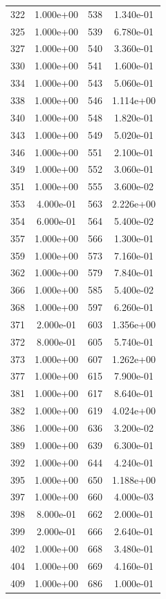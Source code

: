\documentclass[12pt]{article}
\begin{document}
\begin{longtable}{@{}cccc@{}}
322 & 1.000e+00 & 538 & 1.340e-01 \\
325 & 1.000e+00 & 539 & 6.780e-01 \\
327 & 1.000e+00 & 540 & 3.360e-01 \\
330 & 1.000e+00 & 541 & 1.600e-01 \\
334 & 1.000e+00 & 543 & 5.060e-01 \\
338 & 1.000e+00 & 546 & 1.114e+00 \\
340 & 1.000e+00 & 548 & 1.820e-01 \\
343 & 1.000e+00 & 549 & 5.020e-01 \\
346 & 1.000e+00 & 551 & 2.100e-01 \\
349 & 1.000e+00 & 552 & 3.060e-01 \\
351 & 1.000e+00 & 555 & 3.600e-02 \\
353 & 4.000e-01 & 563 & 2.226e+00 \\
354 & 6.000e-01 & 564 & 5.400e-02 \\
357 & 1.000e+00 & 566 & 1.300e-01 \\
359 & 1.000e+00 & 573 & 7.160e-01 \\
362 & 1.000e+00 & 579 & 7.840e-01 \\
366 & 1.000e+00 & 585 & 5.400e-02 \\
368 & 1.000e+00 & 597 & 6.260e-01 \\
371 & 2.000e-01 & 603 & 1.356e+00 \\
372 & 8.000e-01 & 605 & 5.740e-01 \\
373 & 1.000e+00 & 607 & 1.262e+00 \\
377 & 1.000e+00 & 615 & 7.900e-01 \\
381 & 1.000e+00 & 617 & 8.640e-01 \\
382 & 1.000e+00 & 619 & 4.024e+00 \\
386 & 1.000e+00 & 636 & 3.200e-02 \\
389 & 1.000e+00 & 639 & 6.300e-01 \\
392 & 1.000e+00 & 644 & 4.240e-01 \\
395 & 1.000e+00 & 650 & 1.188e+00 \\
397 & 1.000e+00 & 660 & 4.000e-03 \\
398 & 8.000e-01 & 662 & 2.000e-01 \\
399 & 2.000e-01 & 666 & 2.640e-01 \\
402 & 1.000e+00 & 668 & 3.480e-01 \\
404 & 1.000e+00 & 669 & 4.160e-01 \\
409 & 1.000e+00 & 686 & 1.000e-01 \\

\end{longtable}
\end{document}
